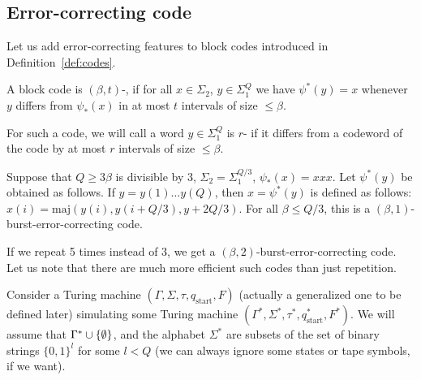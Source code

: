 \documentclass[12pt]{memoir}
\renewcommand{\le}{\leq}
\renewcommand{\ge}{\geq}
\newcommand{\fld}[1]{\ensuremath{\textit{#1\/}}}
\newcommand{\maj}{\mathrm{maj}}
\def\B{B}
\newcommand{\Q}{Q}
\newcommand{\Tu}{T}
\newcommand{\Tus}{T^{*}}
\newcommand{\cDir}{\fld{cDir}}
\newcommand{\NonAdj}{\fld{NonAdj}}
\newcommand{\start}{\mathrm{start}}
\begin{document}
\subsection{Error-correcting code}\label{sec:coding}

Let us add error-correcting features to block codes introduced in
Definition~\ref{def:codes}.

\begin{sloppypar}
\begin{definition}\label{def:err-code}
A block code is \( (\beta,t) \)-,
if for all \( x\in\Sigma_{2} \), \( y\in\Sigma_{1}^{\Q} \) we
have \( \psi^{*}(y)=x \) whenever \( y \) differs from
\( \psi_{*}(x) \) in at most \( t \) intervals of size \( \le\beta \).

For such a code, we will call a word \( y\in\Sigma_{1}^{\Q} \) is \( r \)-
if it differs from a codeword of the code by at most \( r \) intervals of size \( \le\beta \).
\end{definition}
  \end{sloppypar}

\begin{example}\label{xmp:tripling}
  Suppose that \( \Q\ge 3\beta \) is divisible by 3,
  \( \Sigma_{2}=\Sigma_{1}^{\Q/3} \), \( \psi_{*}(x)=xxx \).
  Let \( \psi^{*}(y) \) be obtained as follows.
  If \( y=y(1)\dots y(\Q) \), then \( x=\psi^{*}(y) \) is defined as follows:
    \( x(i)=\maj(y(i),y(i+\Q/3),y+2\Q/3) \).
    For all \( \beta\le \Q/3 \), this is a
    \( (\beta,1) \)-burst-error-correcting code.

    If we repeat 5 times instead of 3, we get a \( (\beta,2) \)-burst-error-correcting
    code.
    Let us note that there are much more efficient such codes than just repetition.
 \end{example}

Consider a Turing machine 
\( (\Gamma, \Sigma,\tau, q_{\start},F) \) (actually a generalized one to be defined later)
simulating some Turing machine \( (\Gamma^{*}, \Sigma^{*},\tau^{*}, q^{*}_{\start},F^{*}) \).
We will assume that \( \Gamma^{*}\cup\mathopen\{\emptyset\mathclose\} \),
and the alphabet \( \Sigma^{*} \) are subsets of the set of  binary strings
\( \{0,1\}^{l} \) for some \( l<\Q \) (we can always ignore some states or tape
symbols, if we want).
\end{document}
